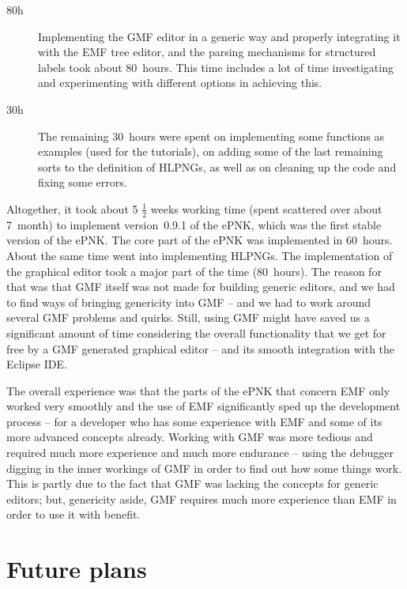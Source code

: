 \begin{description}
\item[80h] Implementing the GMF editor in a generic way and properly 
           integrating it with the EMF tree editor, and the parsing mechanisms
           for structured labels took about 80~hours. This time includes
           a lot of time investigating and experimenting with different
           options in achieving this.  
           
\item[30h] The remaining 30~hours were spent on implementing some functions
          as examples (used for the tutorials), on adding some of the
          last remaining sorts to the definition of HLPNGs, as well
          as on cleaning up the code and fixing some errors.           
\end{description}

Altogether, it took about 5 $\frac{1}{2}$ weeks working time (spent scattered
over about 7~month) to implement version~0.9.1 of the ePNK, which was the
first stable version of the ePNK. The core part of the ePNK was implemented
in 60~hours. About the same time went into implementing HLPNGs. The
implementation of the graphical editor took a major part of the time (80~hours).
The reason for that was that GMF itself was not made for building
generic editors, and we had to find ways of bringing genericity into GMF --
and we had to work around several GMF problems and quirks. Still, using GMF
might have saved us a significant amount of time considering the overall functionality
that we get for free by a GMF generated graphical editor -- and its smooth
integration with the Eclipse IDE.  

The overall experience was that the parts of the ePNK that concern EMF only
worked very smoothly and the use of EMF significantly sped up the
development process -- for a developer who has some experience with EMF
and some of its more advanced concepts already. Working with GMF was more
tedious and required much more experience and much more endurance --
using the debugger digging in the inner workings of GMF in order to find out
how some things work. This is partly due to the fact that GMF was lacking
the concepts for generic editors; but, genericity aside, GMF requires
much more experience than EMF in order to use it with benefit.

\section{Future plans}
\label{sec:inside:plans}


